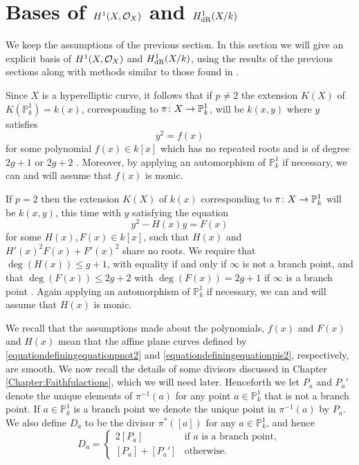 \section{Bases of $H^1(X,\mathcal{O}_X)$ and $H^1_{\rm {dR}}(X/k)$}


We keep the assumptions of the previous section.
In this section we will give an explicit basis of $H^1(X,\mathcal{O}_X)$ and $H_{\text {dR}}^1(X/k)$, using the results of the previous sections along with methods similar to those found in \cite{canonicalrepresentation}.

Since $X$ is a hyperelliptic curve, it follows that if $p \neq 2$ the extension $K(X)$ of $K(\mathbb P_k^1) = k(x)$, corresponding to $ \pi \colon X \rightarrow \mathbb P_k^1$, will be $k(x,y)$ where $y$ satisfies
    \begin{equation}\label{equationdefiningequationpnot2}
    y^2 = f(x)
    \end{equation}
for some polynomial $f(x) \in k[x]$ which has no repeated roots and is of degree $2g+1$ or $2g+2$ \cite[Prop.\ 7.4.24]{liu}.
Moreover, by applying an automorphism of $\mathbb P_k^1$ if necessary, we can and will assume that $f(x)$ is monic.

If $p=2$ then the extension $K(X)$ of $k(x)$ corresponding to $\pi \colon X \rightarrow \mathbb P_k^1$ will be $k(x,y)$, this time with $y$ satisfying the equation
    \begin{equation}\label{equationdefiningequationpis2}
    y^2 - H(x)y = F(x)
    \end{equation}
for some $H(x),F(x) \in k[x]$, such that $H(x)$ and $H'(x)^2F(x) + F'(x)^2$ share no roots.
We require that $\deg(H(x)) \leq g+1$, with equality if and only if $\infty$ is not a branch point, and that $\deg(F(x)) \leq 2g+2$ with $\deg(F(x)) = 2g+1$ if $\infty$ is a branch point  \cite[Prop.\ 7.4.24]{liu}.
Again applying an automorphism of $\mathbb P_k^1$ if necessary, we can and will assume that $H(x)$ is monic.

We recall that the assumptions made about the polynomials, $f(x)$ and $F(x)$ and $H(x)$ mean that the affine plane curves defined by \eqref{equationdefiningequationpnot2} and \eqref{equationdefiningequationpis2}, respectively, are smooth.
We now recall the details of some divisors discussed in Chapter \ref{Chapter:Faithfulactions}, which we will need later.
Henceforth we let $P_a$ and $P_a'$ denote the unique elements of $\pi^{-1}(a)$ for any point $a \in \mathbb P_k^1$ that is not a branch point.
If $a \in \mathbb P_k^1$ is a branch point we denote the unique point in $\pi^{-1}(a)$ by $P_a$.
We also define $D_a$ to be the divisor $\pi^*\left([a]\right)$ for any $a \in \mathbb P_k^1$, and hence
    \begin{equation*}
    D_a= 
        \begin{cases}
         2[P_a] & \text{if $a$ is a branch point}, \\
         [P_a] + [P_a'] & \text{otherwise.}
        \end{cases}
    \end{equation*}


